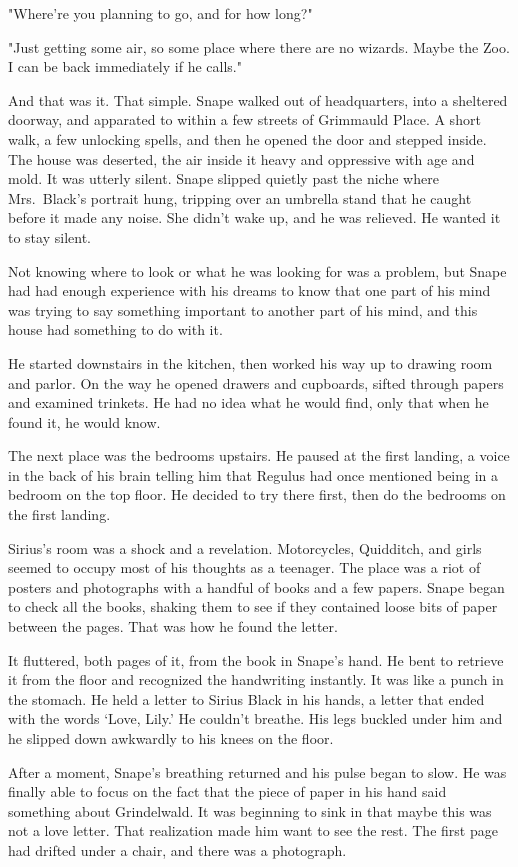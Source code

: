 "Where're you planning to go, and for how long?"

"Just getting some air, so some place where there are no wizards. Maybe the Zoo. I can be back immediately if he calls."

And that was it. That simple. Snape walked out of headquarters, into a sheltered doorway, and apparated to within a few streets of Grimmauld Place. A short walk, a few unlocking spells, and then he opened the door and stepped inside. The house was deserted, the air inside it heavy and oppressive with age and mold. It was utterly silent. Snape slipped quietly past the niche where Mrs.~Black's portrait hung, tripping over an umbrella stand that he caught before it made any noise. She didn't wake up, and he was relieved. He wanted it to stay silent.

Not knowing where to look or what he was looking for was a problem, but Snape had had enough experience with his dreams to know that one part of his mind was trying to say something important to another part of his mind, and this house had something to do with it.

He started downstairs in the kitchen, then worked his way up to drawing room and parlor. On the way he opened drawers and cupboards, sifted through papers and examined trinkets. He had no idea what he would find, only that when he found it, he would know.

The next place was the bedrooms upstairs. He paused at the first landing, a voice in the back of his brain telling him that Regulus had once mentioned being in a bedroom on the top floor. He decided to try there first, then do the bedrooms on the first landing.

Sirius's room was a shock and a revelation. Motorcycles, Quidditch, and girls seemed to occupy most of his thoughts as a teenager. The place was a riot of posters and photographs with a handful of books and a few papers. Snape began to check all the books, shaking them to see if they contained loose bits of paper between the pages. That was how he found the letter.

It fluttered, both pages of it, from the book in Snape's hand. He bent to retrieve it from the floor and recognized the handwriting instantly. It was like a punch in the stomach. He held a letter to Sirius Black in his hands, a letter that ended with the words `Love, Lily.' He couldn't breathe. His legs buckled under him and he slipped down awkwardly to his knees on the floor.

After a moment, Snape's breathing returned and his pulse began to slow. He was finally able to focus on the fact that the piece of paper in his hand said something about Grindelwald. It was beginning to sink in that maybe this was not a love letter. That realization made him want to see the rest. The first page had drifted under a chair, and there was a photograph.

